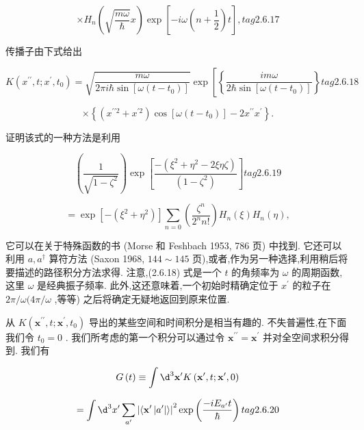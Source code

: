 \documentclass[lang=cn,newtx,10pt,scheme=chinese,thmcnt=section]{elegantbook}
\begin{document}
$$
\times {H}_{n}\left( {\sqrt{\frac{m\omega }{\hbar }}x}\right) \exp \left\lbrack {-{i\omega }\left( {n + \frac{1}{2}}\right) t}\right\rbrack , tag{2.6.17}
$$

传播子由下式给出

$$
K\left( {{x}^{\prime \prime }, t;{x}^{\prime },{t}_{0}}\right) = \sqrt{\frac{m\omega }{{2\pi i}\hbar \sin \left\lbrack {\omega \left( {t - {t}_{0}}\right) }\right\rbrack }}\exp \left\lbrack \left\{ \frac{im\omega }{2\hbar \sin \left\lbrack {\omega \left( {t - {t}_{0}}\right) }\right\rbrack }\right\} \right. tag{2.6.18}
$$

$$
\times \left\{ {\left( {{x}^{\prime \prime 2} + {x}^{\prime 2}}\right) \cos \left\lbrack {\omega \left( {t - {t}_{0}}\right) }\right\rbrack - 2{x}^{\prime \prime }{x}^{\prime }}\right\} .
$$

证明该式的一种方法是利用

$$
\left( \frac{1}{\sqrt{1 - {\zeta }^{2}}}\right) \exp \left\lbrack \frac{-\left( {{\xi }^{2} + {\eta }^{2} - {2\xi \eta \zeta }}\right) }{\left( 1 - {\zeta }^{2}\right) }\right\rbrack tag{2. 6.19}
$$

$$
= \exp \left\lbrack {-\left( {{\xi }^{2} + {\eta }^{2}}\right) }\right\rbrack \mathop{\sum }\limits_{{n = 0}}\left( \frac{{\zeta }^{n}}{{2}^{n}n!}\right) {H}_{n}\left( \xi \right) {H}_{n}\left( \eta \right) ,
$$

它可以在关于特殊函数的书 (Morse 和 Feshbach 1953, 786 页) 中找到. 它还可以利用 $a,{a}^{ \dagger }$ 算符方法 (Saxon 1968, ${144} \sim {145}$ 页),或者,作为另一种选择,利用稍后将要描述的路径积分方法求得. 注意,(2.6.18) 式是一个 $t$ 的角频率为 $\omega$ 的周期函数,这里 $\omega$ 是经典振子频率. 此外,这还意味着,一个初始时精确定位于 ${x}^{\prime }$ 的粒子在 ${2\pi }/\omega ({4\pi }/\omega$ ,等等) 之后将确定无疑地返回到原来位置.

从 $K\left( {{\mathbf{x}}^{\prime \prime }, t;{\mathbf{x}}^{\prime },{t}_{0}}\right)$ 导出的某些空间和时间积分是相当有趣的. 不失普遍性,在下面我们令 ${t}_{0} = 0$ . 我们所考虑的第一个积分可以通过令 ${\mathbf{x}}^{\prime \prime } = {\mathbf{x}}^{\prime }$ 并对全空间求积分得到. 我们有

$$
G\left( t\right) \equiv \int {\d}^{3}{\mathbf{x}}^{\prime }K\left( {{\mathbf{x}}^{\prime }, t;{\mathbf{x}}^{\prime },0}\right)
$$

$$
= \int {\d}^{3}{x}^{\prime }\mathop{\sum }\limits_{{a}^{\prime }}{\left| \left\langle {\mathbf{x}}^{\prime }\left| {a}^{\prime }\right| \right\rangle \right| }^{2}\exp \left( \frac{-i{E}_{{a}^{\prime }}t}{\hbar }\right) tag{2.6.20}
$$
\end{document}
